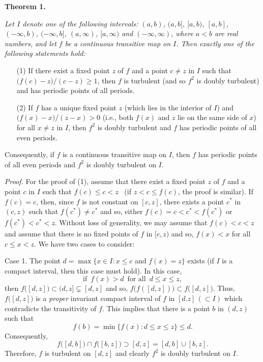 \documentclass[12pt]{article}
\begin{document}
\noindent
{\bf Theorem 1.} 
{\it Let $I$ denote one of the following intervals: $(a, b)$, $(a, b]$, $[a, b)$, $[a, b]$, $(-\infty, b)$, $(-\infty, b]$, $(a, \infty)$, $[a, \infty)$ and $(-\infty, \infty)$, where $a < b$ are real numbers, and let $f$ be a continuous transitive map on $I$.  Then exactly one of the following statements hold:  
\begin{itemize}
\item[{\rm (1)}]
If there exist a fixed point $z$ of $f$ and a point $c \ne z$ in $I$ such that $\bigr(f(c)-z\bigr)/(c-z) \ge 1$, then $f$ is turbulent (and so $f^2$ is doubly turbulent) and has periodic points of all periods.

\item[{\rm (2)}]
If $f$ has a unique fixed point $z$ (which lies in the interior of $I$) and $\bigr(f(x) - x\bigl)/(z - x) > 0$ (i.e., both $f(x)$ and $z$ lie on the same side of $x$) for all $x \ne z$ in $I$, then $f^2$ is doubly turbulent and $f$ has periodic points of all even periods. 
\end{itemize}
\noindent
Consequently, if $f$ is a continuous transitive map on $I$, then $f$ has periodic points of all even periods and $f^2$ is doubly turbulent on $I$.}

\noindent
{\it Proof.}
For the proof of (1), assume that there exist a fixed point $z$ of $f$ and a point $c$ in $I$ such that $f(c) \le c < z$ \, \big(if $z < c \le f(c)$, the proof is similar\big).  If $f(c) = c$, then, since $f$ is not constant on $[c, z]$, there exists a point $c^*$ in $(c, z)$ such that $f(c^*) \ne c^*$ and so, either $f(c) = c < c^* < f(c^*)$ or $f(c^*) < c^* < z$.  Without loss of generality, we may assume that $f(c) < c < z$  and assume that there is no fixed points of $f$ in $[c, z)$ and so, $f(x) < x$ for all $c \le x < z$.  We have two cases to consider: 

Case 1. The point $d = \max \big\{ x \in I : x \le c$ and $f(x) = z \big\}$ exists (if $I$ is a compact interval, then this case must hold).  In this case, $$\text{if} \,\,\, f(x) > d \,\,\, \text{for all} \,\,\, d \le x \le z,$$ then $f\big([d, z]\big) \subset (d, z] \subsetneq [d, z]$ and so, $f\bigl(f([d,z])\bigr) \subset f\big([d, z]\big)$.  Thus, $f\bigl([d, z]\bigr)$ is a {\it proper} invariant compact interval of $f$ in $[d. z] \, (\subset I)$ which contradicts the transitivity of $f$.  This implies that there is a point $b$ in $(d, z)$ such that $$f(b) = \min \big\{ f(x) : d \le x \le z \big\} \le d.$$Consequently, $$f\bigl([d, b]\bigr) \cap f\bigl([b, z]\bigr) \supset [d, z] = [d, b] \cup [b, z].$$  Therefore, $f$ is turbulent on $[d, z]$ and clearly $f^2$ is doubly turbulent on $I$.
\end{document}
